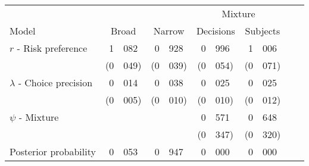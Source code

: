 \begin{tabular}{l r@{.}l r@{.}l r@{.}l r@{.}l r@{.}l}\\ \hline\hline
&\multicolumn{2}{c}{}&\multicolumn{2}{c}{}&\multicolumn{4}{c}{Mixture}\\ 
Model&\multicolumn{2}{c}{ Broad }&\multicolumn{2}{c}{ Narrow }&\multicolumn{2}{c}{ Decisions }&\multicolumn{2}{c}{ Subjects } \\ \hline 
$r$ - Risk preference& 1 & 082& 0 & 928& 0 & 996& 1 & 006 \\ 
& (0 & 049)& (0 & 039)& (0 & 054)& (0 & 071) \\ 
$\lambda$ - Choice precision& 0 & 014& 0 & 038& 0 & 025& 0 & 025 \\ 
& (0 & 005)& (0 & 010)& (0 & 010)& (0 & 012) \\ 
$\psi$ - Mixture& \multicolumn{2}{c}{}& \multicolumn{2}{c}{}& 0 & 571& 0 & 648 \\ 
& \multicolumn{2}{c}{}& \multicolumn{2}{c}{}& (0 & 347)& (0 & 320) \\ 
 \hline 
Posterior probability& 0 & 053& 0 & 947& 0 & 000& 0 & 000 \\ \hline\hline
 \end{tabular}
